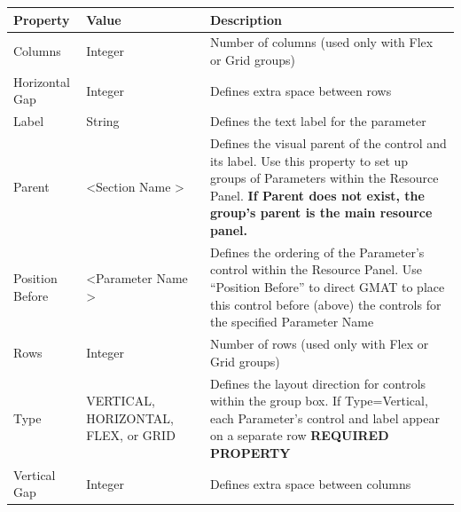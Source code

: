 \documentclass[10pt,letterpaper]{article}
\begin{document}
\begin{center}
\begin{tabular}{|l|p{1.8in}|p{3.0in}|}
\hline 
\textbf{Property} & \textbf{Value} & \textbf{Description} \\ 
\hline 
 Columns & Integer & Number of columns (used only with Flex or Grid groups) \\ 
\hline 
 Horizontal Gap & Integer & Defines extra space between rows \\ 
\hline 
 Label & String & Defines the text label for the parameter \\ 
\hline 
 Parent & \textless Section Name \textgreater & Defines the visual parent of the control and its label.  Use this property to set up groups of Parameters within the Resource Panel.  \textbf{If Parent does not exist, the group's parent is the main resource panel.} \\ 
\hline 
 Position Before & \textless Parameter Name \textgreater & Defines the ordering of the Parameter's control within the Resource Panel.  Use ``Position Before'' to direct GMAT to place this control before (above) the controls for the specified Parameter Name \\ 
\hline 
 Rows & Integer & Number of rows (used only with Flex or Grid groups) \\ 
\hline 
 Type & VERTICAL, HORIZONTAL, FLEX, or GRID & Defines the layout direction for controls within the group box.  If Type=Vertical, each Parameter's control and label appear on a separate row
\textbf{REQUIRED PROPERTY}
 \\ 
\hline 
 Vertical Gap & Integer & Defines extra space between columns \\ 
\hline 
\end{tabular} 
\end{center}
\end{document}
